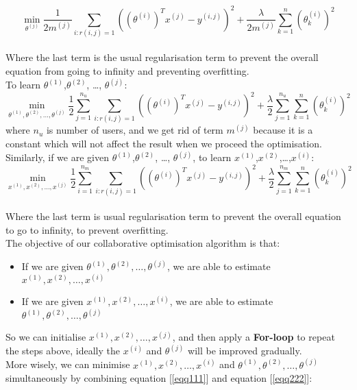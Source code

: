 \begin{equation*}
\min_{\theta^{(j)}} \frac{1}{2m^{(j)}}\sum_{i:r(i,j) = 1}\left((\theta^{(i)})^{T}x^{(j)}-y^{(i,j)}\right)^{2} + \frac{\lambda}{2m^{(j)}}\sum_{k = 1}^{n}(\theta^{(i)}_{k})^{2}
\end{equation*}
\\Where the last term is the usual regularisation term to prevent the overall equation from going to infinity and preventing overfitting.
\\ To learn $\theta^{(1)}$,$\theta^{(2)}$, \dots, $\theta^{(j)}$:
\begin{equation}
\label{eqq111}
\min_{\theta^{(1)},\theta^{(2)}, \dots, \theta^{(j)}} \frac{1}{2}\sum_{j = 1}^{n_{u}}\sum_{i:r(i,j) = 1}\left((\theta^{(i)})^{T}x^{(j)}-y^{(i,j)}\right)^{2} + \frac{\lambda}{2}\sum_{j = 1}^{n_{u}}\sum_{k = 1}^{n}(\theta^{(i)}_{k})^{2}
\end{equation}
where $n_{u}$ is number of users, and we get rid of term $m^{(j)}$ because it is a constant which will not affect the result when we proceed the optimisation.
\\Similarly, if we are given $\theta^{(1)}$,$\theta^{(2)}$, \dots, $\theta^{(j)}$, to learn $x^{(1)}$,$x^{(2)}$,\dots,$x^{(i)}$:
\begin{equation}
\label{eqq222}
\min_{x^{(1)},x^{(2)}, \dots,x^{(j)}} \frac{1}{2}\sum_{i = 1}^{n_{m}}\sum_{i:r(i,j) = 1}\left((\theta^{(i)})^{T}x^{(j)}-y^{(i,j)}\right)^{2} + \frac{\lambda}{2}\sum_{j = 1}^{n_{m}}\sum_{k = 1}^{n}(\theta^{(i)}_{k})^{2}
\end{equation}
\\Where the last term is usual regularisation term to prevent the overall equation to go to infinity, to prevent overfitting.
\\The objective of our collaborative optimisation algorithm is that:
\begin{itemize}
\item  If we are given $\theta^{(1)},\theta^{(2)}, \dots, \theta^{(j)}$, we are able to estimate $x^{(1)},x^{(2)}, \dots,x^{(i)}$
\item  If we are given $x^{(1)},x^{(2)}, \dots,x^{(i)}$, we are able to estimate $\theta^{(1)},\theta^{(2)}, \dots, \theta^{(j)}$
\end{itemize}
So we can initialise $x^{(1)},x^{(2)}, \dots,x^{(j)}$, and then apply a \textbf{For-loop} to repeat the steps above, ideally the $x^{(i)}$ and $\theta^{(j)}$ will be improved gradually. 
\\ More wisely, we can minimise $x^{(1)},x^{(2)}, \dots,x^{(i)}$ and $\theta^{(1)},\theta^{(2)}, \dots, \theta^{(j)}$ simultaneously by combining equation [\ref{eqq111}] and equation [\ref{eqq222}]:
